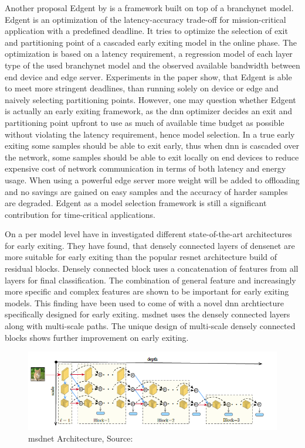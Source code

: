 Another proposal Edgent \cite{li_edge_2018} by \citeauthor{li_edge_2018} is a framework built on top of a \gls{branchynet} model. Edgent is an optimization of the latency-accuracy trade-off for mission-critical application with a predefined deadline. It tries to optimize the selection of exit and partitioning point of a cascaded early exiting model in the online phase. The optimization is based on a latency requirement, a regression model of each layer type of the used \gls{branchynet} model and the observed available bandwidth between end device and edge server. Experiments in the paper show, that Edgent is able to meet more stringent deadlines, than running solely on device or edge and naively selecting partitioning points. However, one may question whether Edgent is actually an early exiting framework, as the \gls{dnn} optimizer decides an exit and partitioning point upfront to use as much of available time budget as possible without violating the latency requirement, hence model selection. In a true early exiting some samples should be able to exit early, thus when \gls{dnn} is cascaded over the network, some samples should be able to exit locally on end devices to reduce expensive cost of network communication in terms of both latency and energy usage. When using a powerful edge server more weight will be added to offloading and no savings are gained on easy samples and the accuracy of harder samples are degraded. Edgent as a model selection framework is still a significant contribution for time-critical applications.

On a per model level \citeauthor{huang_multi-scale_2017} have in \cite{huang_multi-scale_2017} investigated different state-of-the-art architectures for early exiting. They have found, that  densely connected layers of \gls{densenet} \cite{huang_densely_2016} are more suitable for early exiting than the popular \gls{resnet} architecture build of residual blocks. Densely connected block uses a concatenation of features from all layers for final classification. The combination of  general feature and increasingly more specific and complex features are shown to be important for early exiting models. This finding have been used to come of with a novel \gls{dnn} archtiecture specifically designed for early exiting. \gls{msdnet} \cite{huang_multi-scale_2017} uses the densely connected layers along with multi-scale paths. The unique design of multi-scale densely connected blocks shows further improvement on early exiting.

\begin{figure}
	\centering
	\includegraphics[width=\linewidth]{figures/models/msdnet}
	\caption[\gls{msdnet} Architecture]{\gls{msdnet} Architecture, Source:  \cite{huang_multi-scale_2017}}
\end{figure}

